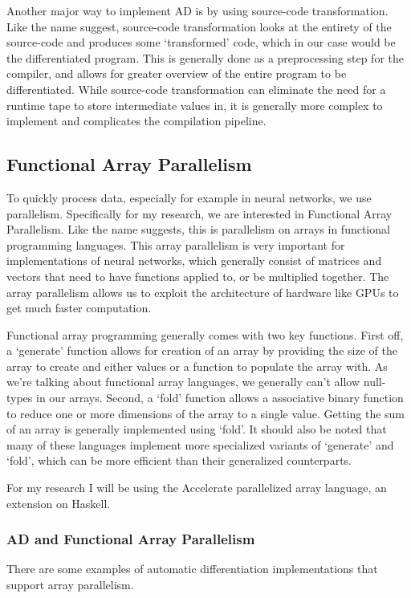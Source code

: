 \documentclass{article}
\begin{document}
                Another major way to implement AD is by using source-code transformation.
                Like the name suggest, source-code transformation looks at the entirety of the source-code and produces some `transformed' code, which in our case would be the differentiated program.
                This is generally done as a preprocessing step for the compiler, and allows for greater overview of the entire program to be differentiated.
                While source-code transformation can eliminate the need for a runtime tape to store intermediate values in, it is generally more complex to implement and complicates the compilation pipeline.

        \subsection{Functional Array Parallelism}
            To quickly process data, especially for example in neural networks, we use parallelism.
            Specifically for my research, we are interested in Functional Array Parallelism.
            Like the name suggests, this is parallelism on arrays in functional programming languages.
            This array parallelism is very important for implementations of neural networks, which generally consist of matrices and vectors that need to have functions applied to, or be multiplied together.
            The array parallelism allows us to exploit the architecture of hardware like GPUs to get much faster computation.
            
            Functional array programming generally comes with two key functions.
            First off, a `generate' function allows for creation of an array by providing the size of the array to create and either values or a function to populate the array with.
            As we're talking about functional array languages, we generally can't allow null-types in our arrays.
            Second, a `fold' function allows a associative binary function to reduce one or more dimensions of the array to a single value.
            Getting the sum of an array is generally implemented using `fold'.
            It should also be noted that many of these languages implement more specialized variants of `generate' and `fold', which can be more efficient than their generalized counterparts.

            For my research I will be using the Accelerate parallelized array language, an extension on Haskell.

            \subsubsection{AD and Functional Array Parallelism}
                There are some examples of automatic differentiation implementations that support array parallelism.
                
\end{document}
